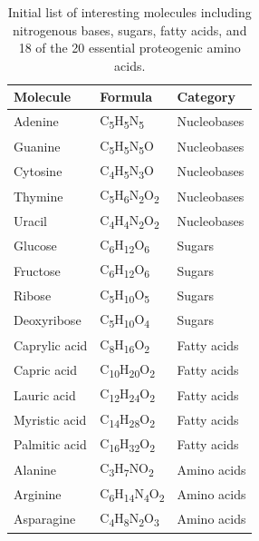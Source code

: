 \begin{table}[h!]
\centering
\caption[Initial list of interesting molecules]{Initial list of interesting molecules including nitrogenous bases, sugars, fatty acids, and 18 of the 20 essential proteogenic amino acids.
}\label{tbl:molfind_targets}
\begin{tabularx}{0.49\textwidth}{l l l}  
\toprule
Molecule & Formula & Category \\
\midrule
Adenine  &   C\textsubscript{5}H\textsubscript{5}N\textsubscript{5} & Nucleobases \\
Guanine  &  C\textsubscript{5}H\textsubscript{5}N\textsubscript{5}O & Nucleobases \\
Cytosine  &  C\textsubscript{4}H\textsubscript{5}N\textsubscript{3}O & Nucleobases \\
Thymine  & C\textsubscript{5}H\textsubscript{6}N\textsubscript{2}O\textsubscript{2} & Nucleobases \\
Uracil  & C\textsubscript{4}H\textsubscript{4}N\textsubscript{2}O\textsubscript{2} & Nucleobases \\
Glucose  &  C\textsubscript{6}H\textsubscript{12}O\textsubscript{6} & Sugars \\
Fructose  &  C\textsubscript{6}H\textsubscript{12}O\textsubscript{6} & Sugars \\
Ribose  &  C\textsubscript{5}H\textsubscript{10}O\textsubscript{5} & Sugars \\
Deoxyribose  &  C\textsubscript{5}H\textsubscript{10}O\textsubscript{4} & Sugars \\
Caprylic acid  &  C\textsubscript{8}H\textsubscript{16}O\textsubscript{2} & Fatty acids \\
Capric acid  & C\textsubscript{10}H\textsubscript{20}O\textsubscript{2} & Fatty acids \\
Lauric acid  & C\textsubscript{12}H\textsubscript{24}O\textsubscript{2} & Fatty acids \\
Myristic acid  & C\textsubscript{14}H\textsubscript{28}O\textsubscript{2} & Fatty acids \\
Palmitic acid  & C\textsubscript{16}H\textsubscript{32}O\textsubscript{2} & Fatty acids \\
Alanine  &    C\textsubscript{3}H\textsubscript{7}NO\textsubscript{2} & Amino acids \\
Arginine  &  C\textsubscript{6}H\textsubscript{14}N\textsubscript{4}O\textsubscript{2} & Amino acids \\
Asparagine  &   C\textsubscript{4}H\textsubscript{8}N\textsubscript{2}O\textsubscript{3} & Amino acids \\

\end{tabularx}
\end{table}
